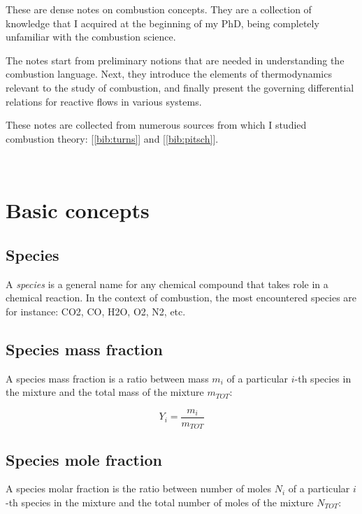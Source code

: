 \documentclass[10pt,twocolumn]{article}
\begin{document}
These are dense notes on combustion concepts. They are a collection of knowledge that I acquired at the beginning of my PhD, being completely unfamiliar with the combustion science.

The notes start from preliminary notions that are needed in understanding the combustion language. Next, they introduce the elements of thermodynamics relevant to the study of combustion, and finally present the governing differential relations for reactive flows in various systems.

These notes are collected from numerous sources from which I studied combustion theory: [\ref{bib:turns}] and [\ref{bib:pitsch}].

\,\,

\newpage

\tableofcontents

\newpage

\section{Basic concepts}

\subsection{Species}

A \textit{species} is a general name for any chemical compound that takes role in a chemical reaction. In the context of combustion, the most encountered species are for instance: CO2, CO, H2O, O2, N2, etc.

\subsection{Species mass fraction}

A species mass fraction is a ratio between mass $m_i$ of a particular $i$-th species in the mixture and the total mass of the mixture $m_{TOT}$:

\begin{equation}
Y_i = \frac{m_i}{m_{TOT}}
\end{equation}

\subsection{Species mole fraction}

A species molar fraction is the ratio between number of moles $N_i$ of a particular $i$-th species in the mixture and the total number of moles of the mixture $N_{TOT}$:
\end{document}
